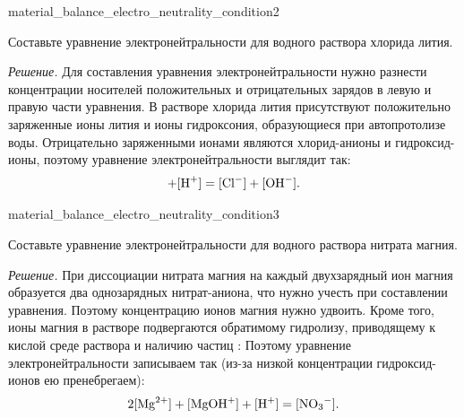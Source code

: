 \begin{example}{}{material_balance_electro_neutrality_condition2}
    \begin{condition}
        Составьте уравнение электронейтральности для водного раствора хлорида лития.
    \end{condition}

    \medskip

    \textit{Решение.} Для составления уравнения электронейтральности нужно разнести концентрации носителей положительных и отрицательных зарядов в левую и правую части уравнения. В растворе хлорида лития присутствуют положительно заряженные ионы лития и ионы гидроксония, образующиеся при автопротолизе воды. Отрицательно заряженными ионами являются хлорид-анионы и гидроксид-ионы, поэтому уравнение электронейтральности выглядит так:
    \begin{equation*}
        [\ce{Li^+}] + [\ce{H^+}] = [\ce{Cl^-}] + [\ce{OH^-}].
    \end{equation*}
\end{example}

\begin{example}{}{material_balance_electro_neutrality_condition3}
    \begin{condition}
        Составьте уравнение электронейтральности для водного раствора нитрата магния.
    \end{condition}

    \medskip

    \textit{Решение.} При диссоциации нитрата магния на каждый двухзарядный ион магния образуется два однозарядных нитрат-аниона, что нужно учесть при составлении уравнения. Поэтому концентрацию ионов магния нужно удвоить. Кроме того, ионы магния в растворе подвергаются обратимому гидролизу, приводящему к кислой среде раствора и наличию частиц :
    Поэтому уравнение электронейтральности записываем так (из-за низкой концентрации гидроксид-ионов ею пренебрегаем):
    \begin{equation*}
        2[\ce{Mg^{2+}}] + [\ce{MgOH^+}] + [\ce{H^+}] = [\ce{NO3^-}].
    \end{equation*}
\end{example}

